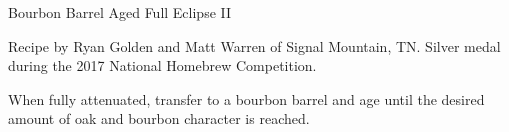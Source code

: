 \stylesection{\styleimperialstout}

\begin{recipe}{Bourbon Barrel Aged Full Eclipse II}

\begin{aboutblock}
Recipe by Ryan Golden and Matt Warren of Signal Mountain, TN. Silver medal
during the 2017 National Homebrew Competition. \sourceaha
\end{aboutblock}


\begin{methodandtiming}
 
\begin{mashsteps}
\end{mashsteps}

\begin{fermentationsteps}
\end{fermentationsteps}

\begin{directions}
When fully attenuated, transfer to a bourbon barrel and age until the desired amount
of oak and bourbon character is reached.
\end{directions}

\end{methodandtiming}

\recipebreak

\begin{ingredientsblock}

\begin{malts}
\end{malts}

\begin{hops}

\end{hops}


\end{ingredientsblock}

\end{recipe}

